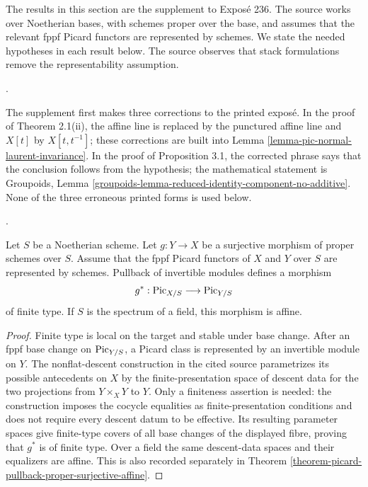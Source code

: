 \noindent
The results in this section are the supplement to Expos\'e 236. The source
works over Noetherian bases, with schemes proper over the base, and assumes
that the relevant fppf Picard functors are represented by schemes. We state
the needed hypotheses in each result below. The source observes that stack
formulations remove the representability assumption.

\begin{remark}
\label{remark-picard-supplement-corrections}
\begin{reference}
\cite[Supplement to Expos\'e 236, p. 303]{FGA}.
\end{reference}
The supplement first makes three corrections to the printed expos\'e. In the
proof of Theorem 2.1(ii), the affine line is replaced by the punctured affine
line and $X[t]$ by $X[t,t^{-1}]$; these corrections are built into Lemma
\ref{lemma-pic-normal-laurent-invariance}. In the proof of Proposition 3.1,
the corrected phrase says that the conclusion follows from the hypothesis;
the mathematical statement is Groupoids, Lemma
\ref{groupoids-lemma-reduced-identity-component-no-additive}. None of the
three erroneous printed forms is used below.
\end{remark}

\begin{theorem}
\label{theorem-picard-pullback-proper-surjective-finite-type}
\begin{reference}
\cite[Supplement to Expos\'e 236, (i), pp. 303 and 307]{FGA}.
\end{reference}
Let $S$ be a Noetherian scheme. Let $g : Y \to X$ be a surjective morphism
of proper schemes over $S$. Assume that the fppf Picard functors of $X$ and
$Y$ over $S$ are represented by schemes. Pullback of invertible modules
defines a morphism
$$
g^* : \mathrm{Pic}_{X/S} \longrightarrow \mathrm{Pic}_{Y/S}
$$
of finite type. If $S$ is the spectrum of a field, this morphism is affine.
\end{theorem}

\begin{proof}
Finite type is local on the target and stable under base change. After an
fppf base change on $\mathrm{Pic}_{Y/S}$, a Picard class is represented by
an invertible module on $Y$. The nonflat-descent construction in the cited
source parametrizes its possible antecedents on $X$ by the finite-presentation
space of descent data for the two projections from $Y \times_X Y$ to $Y$.
Only a finiteness assertion is needed: the construction imposes the cocycle
equalities as finite-presentation conditions and does not require every
descent datum to be effective. Its resulting parameter spaces give
finite-type covers of all base changes of the displayed fibre, proving that
$g^*$ is of finite type. Over a field the same descent-data spaces and their
equalizers are affine. This is also recorded separately in Theorem
\ref{theorem-picard-pullback-proper-surjective-affine}.
\end{proof}

